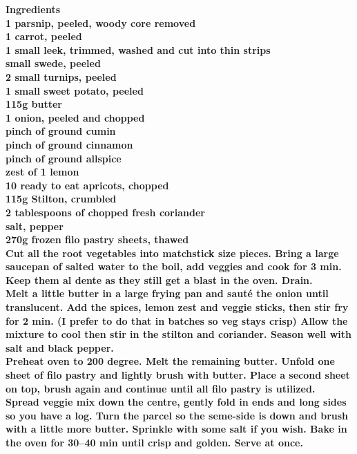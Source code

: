 \documentclass[18pt, oneside]{book}
\begin{document}
\bf{Ingredients} \normalfont \\
1 parsnip, peeled, woody core removed \\
1 carrot, peeled \\
1 small leek, trimmed, washed and cut into thin strips \\
 small swede, peeled \\
2 small turnips, peeled \\
1 small sweet potato, peeled \\
115g butter \\
1 onion, peeled and chopped \\
pinch of ground cumin \\
pinch of ground cinnamon \\
pinch of ground allspice \\
zest of 1 lemon \\
10 ready to eat apricots, chopped \\
115g Stilton, crumbled \\
2 tablespoons of chopped fresh coriander \\
salt, pepper \\
270g frozen filo pastry sheets, thawed \\

Cut all the root vegetables into matchstick size pieces. Bring a large saucepan of salted water to the boil, add veggies and cook for 3 min. Keep them al dente as they still get a blast in the oven. Drain. \\

Melt a little butter in a large frying pan and sauté  the onion until translucent. Add the spices,  lemon zest and veggie sticks, then stir fry for 2 min. (I prefer to do that in batches so veg stays crisp) Allow the mixture to cool then stir in the stilton and coriander. Season well with salt and black pepper. \\

Preheat oven to 200 degree. Melt the remaining butter. Unfold one sheet of filo pastry and lightly brush with butter. Place a second sheet on top, brush again and continue until all filo pastry is utilized. \\

Spread veggie mix down the centre, gently fold in ends and long sides so you have a log. Turn the parcel so the seme-side is down and brush with a little more butter. Sprinkle with some salt if you wish. Bake in the oven for 30--40 min until crisp and golden. Serve at once. \\
\end{document}
